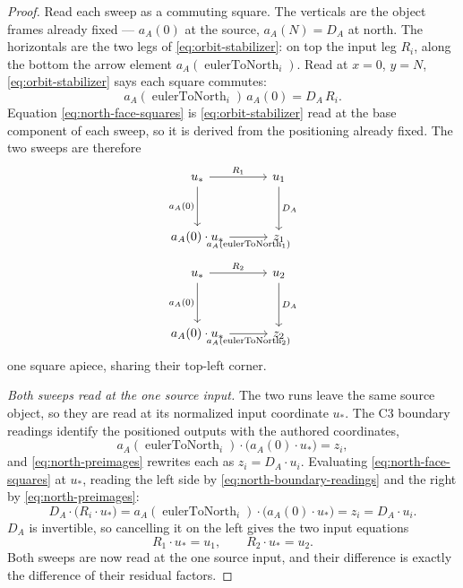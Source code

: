 \documentclass[11pt]{article}
\theoremstyle{plain}
\theoremstyle{definition}
\theoremstyle{remark}
\begin{document}
\begin{proof}
Read each sweep as a commuting square. The verticals are the object frames
already fixed --- $a_A(0)$ at the source, $a_A(N)=D_A$ at north. The horizontals
are the two legs of \eqref{eq:orbit-stabilizer}: on top the input leg $R_i$,
along the bottom the arrow element
$a_A(\operatorname{eulerToNorth}_i)$. Read at $x=0$, $y=N$,
\eqref{eq:orbit-stabilizer} says each square commutes:
\[
  a_A(\operatorname{eulerToNorth}_i)\,a_A(0)=D_A\,R_i .
                                    \tag{S}\label{eq:north-face-squares}
\]
Equation \eqref{eq:north-face-squares} is \eqref{eq:orbit-stabilizer} read at
the base component of each sweep, so it is derived from the positioning already
fixed. The two sweeps are therefore
\[
\begin{tikzcd}[column sep=3em,row sep=3.2em,ampersand replacement=\&]
u_\ast \arrow[r,"R_1"] \arrow[d,"a_A(0)"']\&
u_1 \arrow[d,"D_A"]\\
a_A(0)\mathbin{\cdot}u_\ast
  \arrow[r,"a_A(\operatorname{eulerToNorth}_1)"']\&
z_1
\end{tikzcd}
\]
\[
\begin{tikzcd}[column sep=3em,row sep=3.2em,ampersand replacement=\&]
u_\ast \arrow[r,"R_2"] \arrow[d,"a_A(0)"']\&
u_2 \arrow[d,"D_A"]\\
a_A(0)\mathbin{\cdot}u_\ast
  \arrow[r,"a_A(\operatorname{eulerToNorth}_2)"']\&
z_2
\end{tikzcd}
\]
one square apiece, sharing their top-left corner.

\medskip
\noindent\emph{Both sweeps read at the one source input.}
The two runs leave the same source object, so they are read at its normalized
input coordinate $u_\ast$. The C3 boundary readings identify the positioned
outputs with the authored coordinates,
\[
  a_A(\operatorname{eulerToNorth}_i)\mathbin{\cdot}
    \bigl(a_A(0)\mathbin{\cdot}u_\ast\bigr)=z_i ,
                                    \tag{B}\label{eq:north-boundary-readings}
\]
and \eqref{eq:north-preimages} rewrites each as $z_i=D_A\mathbin{\cdot}u_i$.
Evaluating \eqref{eq:north-face-squares} at $u_\ast$, reading the left side by
\eqref{eq:north-boundary-readings} and the right by
\eqref{eq:north-preimages}:
\[
  D_A\mathbin{\cdot}\bigl(R_i\mathbin{\cdot}u_\ast\bigr)
    =a_A(\operatorname{eulerToNorth}_i)\mathbin{\cdot}
      \bigl(a_A(0)\mathbin{\cdot}u_\ast\bigr)
    =z_i=D_A\mathbin{\cdot}u_i .
\]
$D_A$ is invertible, so cancelling it on the left gives the two input equations
\[
  R_1\mathbin{\cdot}u_\ast=u_1,\qquad
  R_2\mathbin{\cdot}u_\ast=u_2 .
                                    \tag{I}\label{eq:north-input-readings}
\]
Both sweeps are now read at the one source input, and their difference is
exactly the difference of their residual factors.


\end{proof}
\end{document}
